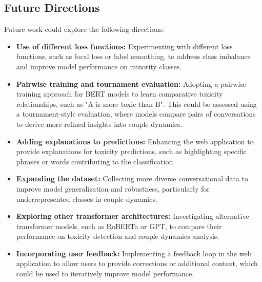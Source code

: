 \documentclass[conference]{IEEEtran}
\begin{document}
\subsection{Future Directions}

Future work could explore the following directions:

\begin{itemize}
    \item \textbf{Use of different loss functions:} Experimenting with different loss functions, such as focal loss or label smoothing, to address class imbalance and improve model performance on minority classes.
    \item \textbf{Pairwise training and tournament evaluation:} Adopting a pairwise training approach for BERT models to learn comparative toxicity relationships, such as "A is more toxic than B". This could be assessed using a tournament-style evaluation, where models compare pairs of conversations to derive more refined insights into couple dynamics.
    \item \textbf{Adding explanations to predictions:} Enhancing the web application to provide explanations for toxicity predictions, such as highlighting specific phrases or words contributing to the classification.
    \item \textbf{Expanding the dataset:} Collecting more diverse conversational data to improve model generalization and robustness, particularly for underrepresented classes in couple dynamics.
    \item \textbf{Exploring other transformer architectures:} Investigating alternative transformer models, such as RoBERTa or GPT, to compare their performance on toxicity detection and couple dynamics analysis.
    \item \textbf{Incorporating user feedback:} Implementing a feedback loop in the web application to allow users to provide corrections or additional context, which could be used to iteratively improve model performance.
\end{itemize}
\noindent



\end{document}
